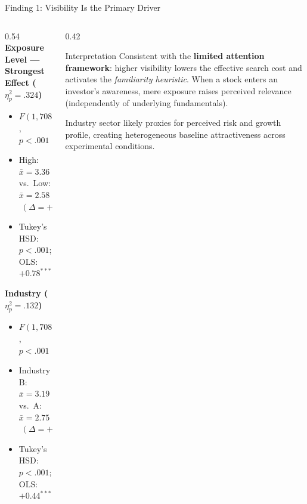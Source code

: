 \documentclass[aspectratio=169, 10pt]{beamer}
\begin{document}
\begin{frame}{Finding 1: Visibility Is the Primary Driver}
  \begin{columns}[T]
    \begin{column}{0.54\textwidth}
      \textbf{Exposure Level — Strongest Effect ($\eta^2_p = .324$)}
      \vspace{0.4em}
      \begin{itemize}
        \setlength\itemsep{0.45em}
        \item $F(1, 708) = 339.12$, $p < .001$
        \item High: $\bar{x} = 3.36$ vs.\ Low: $\bar{x} = 2.58$ $\;(\Delta = +0.78)$
        \item Tukey's HSD: $p < .001$; OLS: $+0.78^{***}$
      \end{itemize}
      \vspace{0.6em}
      \textbf{Industry ($\eta^2_p = .132$)}
      \vspace{0.4em}
      \begin{itemize}
        \setlength\itemsep{0.45em}
        \item $F(1, 708) = 107.98$, $p < .001$
        \item Industry B: $\bar{x} = 3.19$ vs.\ A: $\bar{x} = 2.75$ $\;(\Delta = +0.44)$
        \item Tukey's HSD: $p < .001$; OLS: $+0.44^{***}$
      \end{itemize}
    \end{column}
    \begin{column}{0.42\textwidth}
      \begin{block}{Interpretation}
        Consistent with the \textbf{limited attention framework}: higher visibility lowers the effective search cost and activates the \emph{familiarity heuristic}. When a stock enters an investor's awareness, mere exposure raises perceived relevance (independently of underlying fundamentals).

        \vspace{0.5em}
        Industry sector likely proxies for perceived risk and growth profile, creating heterogeneous baseline attractiveness across experimental conditions.
      \end{block}
    \end{column}
  \end{columns}
\end{frame}
\end{document}
